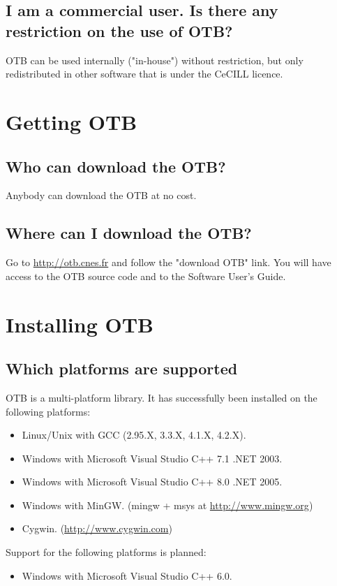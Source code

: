 \subsection{I am a commercial user. Is there any restriction on the
  use of OTB?}
OTB can be used internally ("in-house") without restriction, but only
redistributed in other software that is under the CeCILL licence.

\section{Getting OTB}
\subsection{Who can download the OTB?}
Anybody can download the OTB at no cost. 
\subsection{Where can I download the OTB?}
Go to \url{http://otb.cnes.fr}
 and follow the "download OTB" link. You will have access to the OTB
source code and to the Software User's Guide.
\section{Installing OTB}
\label{sec:FAQInstall}
\subsection{Which platforms are supported}
OTB is a multi-platform library. It has successfully been installed on
the following platforms:
\begin{itemize}
  \item Linux/Unix with GCC (2.95.X, 3.3.X, 4.1.X, 4.2.X).
  \item Windows with Microsoft Visual Studio C++ 7.1 .NET 2003.
  \item Windows with Microsoft Visual Studio C++ 8.0 .NET 2005.  
  \item Windows with MinGW. (mingw + msys at \url{http://www.mingw.org})
  \item Cygwin. (\url{http://www.cygwin.com})
\end{itemize}

Support for the following platforms is planned:
\begin{itemize}
  \item Windows with Microsoft Visual Studio C++ 6.0.
\end{itemize}

